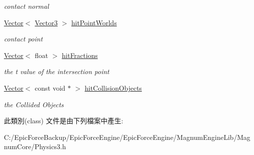 \begin{DoxyCompactItemize}
\begin{DoxyCompactList}\small\item\em contact normal \end{DoxyCompactList}\item 
\hyperlink{class_magnum_1_1_vector}{Vector}$<$ \hyperlink{class_magnum_1_1_vector3}{Vector3} $>$ \hyperlink{class_magnum_1_1_physics3_1_1_convex_cast_result_a1481fe8a2c61158e2c9ff5c8719d94fa}{hit\+Point\+Worlds}\hypertarget{class_magnum_1_1_physics3_1_1_convex_cast_result_a1481fe8a2c61158e2c9ff5c8719d94fa}{}\label{class_magnum_1_1_physics3_1_1_convex_cast_result_a1481fe8a2c61158e2c9ff5c8719d94fa}

\begin{DoxyCompactList}\small\item\em contact point \end{DoxyCompactList}\item 
\hyperlink{class_magnum_1_1_vector}{Vector}$<$ float $>$ \hyperlink{class_magnum_1_1_physics3_1_1_convex_cast_result_ab5dad41ff2c04062349f0bc7ce83ff30}{hit\+Fractions}\hypertarget{class_magnum_1_1_physics3_1_1_convex_cast_result_ab5dad41ff2c04062349f0bc7ce83ff30}{}\label{class_magnum_1_1_physics3_1_1_convex_cast_result_ab5dad41ff2c04062349f0bc7ce83ff30}

\begin{DoxyCompactList}\small\item\em the t value of the intersection point \end{DoxyCompactList}\item 
\hyperlink{class_magnum_1_1_vector}{Vector}$<$ const void $\ast$ $>$ \hyperlink{class_magnum_1_1_physics3_1_1_convex_cast_result_ad74282ec97ca260089f84a745222b4c1}{hit\+Collision\+Objects}\hypertarget{class_magnum_1_1_physics3_1_1_convex_cast_result_ad74282ec97ca260089f84a745222b4c1}{}\label{class_magnum_1_1_physics3_1_1_convex_cast_result_ad74282ec97ca260089f84a745222b4c1}

\begin{DoxyCompactList}\small\item\em the Collided Objects \end{DoxyCompactList}\end{DoxyCompactItemize}


此類別(class) 文件是由下列檔案中產生\+:\begin{DoxyCompactItemize}
\item 
C\+:/\+Epic\+Force\+Backup/\+Epic\+Force\+Engine/\+Epic\+Force\+Engine/\+Magnum\+Engine\+Lib/\+Magnum\+Core/Physics3.\+h\end{DoxyCompactItemize}
